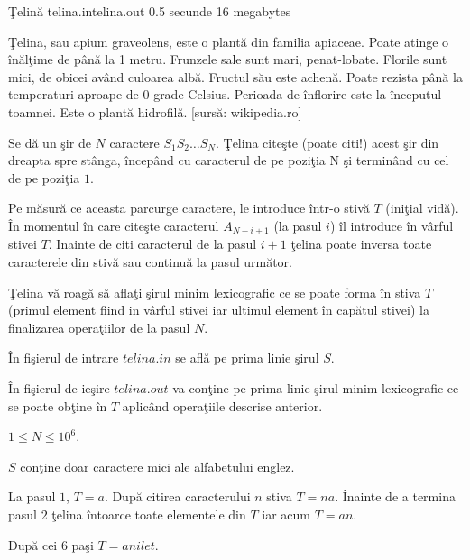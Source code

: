 \begin{problem}{\c{T}elin\u{a}}
{telina.in}{telina.out}
{0.5 secunde} {16 megabytes}{}

\c{T}elina, sau apium graveolens, este o plant\u{a} din familia apiaceae. Poate atinge o \^{i}n\u{a}l\c{t}ime de p\^{a}n\u{a} la 1 metru. Frunzele sale sunt mari, penat-lobate. Florile sunt mici, de obicei av\^{a}nd culoarea alb\u{a}. Fructul s\u{a}u este achen\u{a}. Poate rezista p\^{a}n\u{a} la temperaturi aproape de 0 grade Celsius. Perioada de \^{i}nflorire este la începutul toamnei. Este o plant\u{a} hidrofil\u{a}. [surs\u{a}: wikipedia.ro]

Se d\u{a} un \c{s}ir de $N$ caractere $S_1S_2 \dots S_N$. \c{T}elina cite\c{s}te (poate citi!) acest \c{s}ir din dreapta spre st\^{a}nga, \^{i}ncep\^{a}nd cu caracterul de pe pozi\c{t}ia N \c{s}i termin\^{a}nd cu cel de pe pozi\c{t}ia $1$.

Pe m\u{a}sur\u{a} ce aceasta parcurge caractere, le introduce \^{i}ntr-o stiv\u{a} $T$ (ini\c{t}ial vid\u{a}). \^{I}n momentul \^{i}n care cite\c{s}te caracterul $A_{N-i + 1}$ (la pasul $i$) \^{i}l introduce \^{i}n v\^{a}rful stivei $T$. Inainte de citi caracterul de la pasul $i+1$ \c{t}elina poate inversa toate caracterele din stiv\u{a} sau continu\u{a} la pasul urm\u{a}tor.

\c{T}elina v\u{a} roag\u{a} s\u{a} afla\c{t}i \c{s}irul minim lexicografic ce se poate forma \^{i}n stiva $T$ (primul element fiind in v\^{a}rful stivei iar ultimul element \^{i}n cap\u{a}tul stivei) la finalizarea opera\c{t}iilor de la pasul $N$.


\InputFile

\^{I}n fi\c{s}ierul de intrare $telina.in$ se afl\u{a} pe prima linie \c{s}irul $S$.

\OutputFile

\^{I}n fişierul de ie\c{s}ire $telina.out$ va con\c{t}ine pe prima linie \c{s}irul minim lexicografic ce se poate ob\c{t}ine \^{i}n $T$ aplic\^{a}nd opera\c{t}iile descrise anterior.

\Constraints
$1 \le N \le 10^{6}$.

$S$ con\c{t}ine doar caractere mici ale alfabetului englez.

\Example

\begin{example}
%
\end{example}

\Explanation

La pasul $1$, $T = a$. Dup\u{a} citirea caracterului $n$ stiva $T = na$. \^{I}nainte de a termina pasul $2$ \c{t}elina \^{i}ntoarce toate elementele din $T$ iar acum $T = an$.

Dup\u{a} cei $6$ pa\c{s}i $T = anilet$.

\end{problem}

